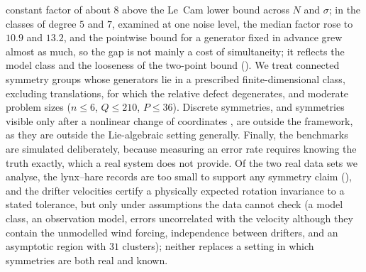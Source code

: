 constant factor of about $8$ above the Le~Cam lower bound across $N$ and
$\sigma$; in the classes of degree $5$ and $7$, examined at one noise level,
the median factor rose to $10.9$ and $13.2$, and the pointwise bound for a
generator fixed in advance grew almost as much, so the gap is not mainly a
cost of simultaneity; it reflects the model class and the looseness of the
two-point bound
(). We treat connected
symmetry groups whose generators lie in a prescribed finite-dimensional class,
excluding translations, for which the relative defect degenerates, and
moderate problem sizes ($n \le 6$, $Q \le 210$, $P \le 36$). Discrete
symmetries, and symmetries visible only after a nonlinear change of coordinates
\citep{liu2022machine,yang2024latent}, are outside the framework, as they are
outside the Lie-algebraic setting generally. Finally, the benchmarks are
simulated deliberately, because measuring an error rate requires knowing the
truth exactly, which a real system does not provide. Of the two real data sets
we analyse, the lynx--hare records are too small to support any symmetry claim
(\SNrealdata), and the drifter velocities certify a physically expected
rotation invariance to a stated tolerance, but only under assumptions the data
cannot check (a model class, an observation model, errors uncorrelated with the
velocity although they contain the unmodelled wind forcing, independence
between drifters, and an asymptotic region with $31$ clusters); neither replaces a setting in which symmetries are both real
and known.

